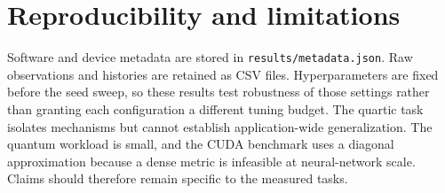 \documentclass[10pt]{article}
\begin{document}
\section{Reproducibility and limitations}
Software and device metadata are stored in \texttt{results/metadata.json}.
Raw observations and histories are retained as CSV files.  Hyperparameters
are fixed before the seed sweep, so these results test robustness of those
settings rather than granting each configuration a different tuning budget.
The quartic task isolates mechanisms but cannot establish application-wide
generalization.  The quantum workload is small, and the CUDA benchmark uses a
diagonal approximation because a dense metric is infeasible at neural-network
scale.  Claims should therefore remain specific to the measured tasks.
\end{document}
